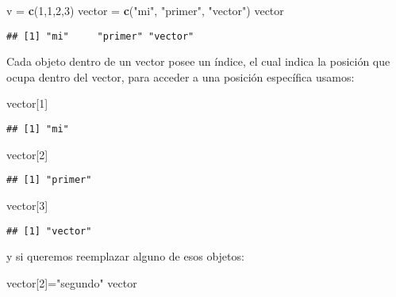 \documentclass[
]{book}
\newenvironment{Shaded}{\begin{snugshade}}{\end{snugshade}}
\newcommand{\DecValTok}[1]{\textcolor[rgb]{0.00,0.00,0.81}{#1}}
\newcommand{\FunctionTok}[1]{\textcolor[rgb]{0.13,0.29,0.53}{\textbf{#1}}}
\newcommand{\NormalTok}[1]{#1}
\newcommand{\OtherTok}[1]{\textcolor[rgb]{0.56,0.35,0.01}{#1}}
\newcommand{\StringTok}[1]{\textcolor[rgb]{0.31,0.60,0.02}{#1}}
\begin{document}
\begin{Shaded}
\begin{Highlighting}[]
\NormalTok{v }\OtherTok{=} \FunctionTok{c}\NormalTok{(}\DecValTok{1}\NormalTok{,}\DecValTok{1}\NormalTok{,}\DecValTok{2}\NormalTok{,}\DecValTok{3}\NormalTok{)}
\NormalTok{vector }\OtherTok{=} \FunctionTok{c}\NormalTok{(}\StringTok{"mi"}\NormalTok{, }\StringTok{"primer"}\NormalTok{, }\StringTok{"vector"}\NormalTok{)}
\NormalTok{vector}
\end{Highlighting}
\end{Shaded}

\begin{verbatim}
## [1] "mi"     "primer" "vector"
\end{verbatim}

Cada objeto dentro de un vector posee un índice, el cual indica la
posición que ocupa dentro del vector, para acceder a una posición
específica usamos:

\begin{Shaded}
\begin{Highlighting}[]
\NormalTok{vector[}\DecValTok{1}\NormalTok{]}
\end{Highlighting}
\end{Shaded}

\begin{verbatim}
## [1] "mi"
\end{verbatim}

\begin{Shaded}
\begin{Highlighting}[]
\NormalTok{vector[}\DecValTok{2}\NormalTok{]}
\end{Highlighting}
\end{Shaded}

\begin{verbatim}
## [1] "primer"
\end{verbatim}

\begin{Shaded}
\begin{Highlighting}[]
\NormalTok{vector[}\DecValTok{3}\NormalTok{] }
\end{Highlighting}
\end{Shaded}

\begin{verbatim}
## [1] "vector"
\end{verbatim}

y si queremos reemplazar alguno de esos objetos:

\begin{Shaded}
\begin{Highlighting}[]
\NormalTok{vector[}\DecValTok{2}\NormalTok{]}\OtherTok{=}\StringTok{"segundo"}
\NormalTok{vector}
\end{Highlighting}
\end{Shaded}
\end{document}
